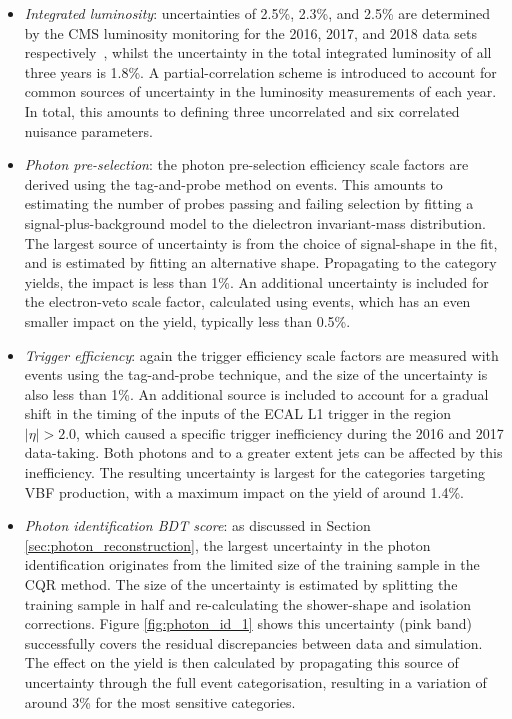 \begin{itemize}
    \item \textit{Integrated luminosity}: uncertainties of 2.5\%, 2.3\%, and 2.5\% are determined by the CMS luminosity monitoring for the 2016, 2017, and 2018 data sets respectively~\cite{CMS-PAS-LUM-17-001,CMS-PAS-LUM-17-004,CMS-PAS-LUM-18-002}, whilst the uncertainty in the total integrated luminosity of all three years is 1.8\%. A partial-correlation scheme is introduced to account for common sources of uncertainty in the luminosity measurements of each year. In total, this amounts to defining three uncorrelated and six correlated nuisance parameters.
    
    \item \textit{Photon pre-selection}: the photon pre-selection efficiency scale factors are derived using the tag-and-probe method on \Zee events. This amounts to estimating the number of probes passing and failing selection by fitting a signal-plus-background model to the dielectron invariant-mass distribution. The largest source of uncertainty is from the choice of signal-shape in the fit, and is estimated by fitting an alternative shape. Propagating to the category yields, the impact is less than 1\%. An additional uncertainty is included for the electron-veto scale factor, calculated using \Zmumug events, which has an even smaller impact on the yield, typically less than 0.5\%. 
    
    \item \textit{Trigger efficiency}: again  the trigger efficiency scale factors are measured with \Zee events using the tag-and-probe technique, and the size of the uncertainty is also less than 1\%. An additional source is included to account for a gradual shift in the timing of the inputs of the ECAL L1 trigger in the region $|\eta|>2.0$, which caused a specific trigger inefficiency during the 2016 and 2017 data-taking. Both photons and to a greater extent jets can be affected by this inefficiency. The resulting uncertainty is largest for the categories targeting VBF production, with a maximum impact on the yield of around 1.4\%.
    
    \item \textit{Photon identification BDT score}: as discussed in Section \ref{sec:photon_reconstruction}, the largest uncertainty in the photon identification originates from the limited size of the training sample in the CQR method. The size of the uncertainty is estimated by splitting the training sample in half and re-calculating the shower-shape and isolation corrections. Figure \ref{fig:photon_id_1} shows this uncertainty (pink band) successfully covers the residual discrepancies between data and simulation. The effect on the yield is then calculated by propagating this source of uncertainty through the full event categorisation, resulting in a variation of around 3\% for the most sensitive categories. 


\end{itemize}

